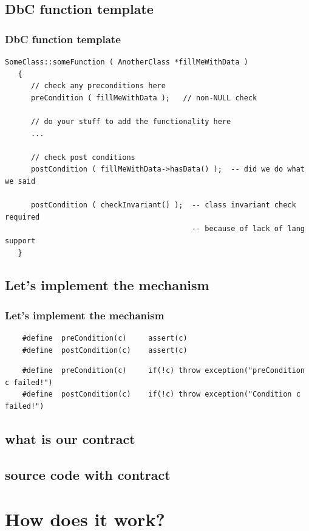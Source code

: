 \documentclass{beamer}
\begin{document}
\subsection{DbC function template}
\begin{frame}[fragile]
\frametitle{DbC function template}
\begin{lstlisting}[caption=http://www.cs.unc.edu/~stotts/COMP204/contract.html]
   SomeClass::someFunction ( AnotherClass *fillMeWithData )
   {
      // check any preconditions here
      preCondition ( fillMeWithData );   // non-NULL check

      // do your stuff to add the functionality here
      ...

      // check post conditions
      postCondition ( fillMeWithData->hasData() );  -- did we do what we said

      postCondition ( checkInvariant() );  -- class invariant check required 
                                           -- because of lack of lang support
   }
\end{lstlisting}
\end{frame}

\subsection{Let's implement the mechanism}
\begin{frame}[fragile]
\frametitle{Let's implement the mechanism}
\begin{lstlisting}
    #define  preCondition(c)     assert(c)
    #define  postCondition(c)    assert(c)
\end{lstlisting}
\begin{lstlisting}
    #define  preCondition(c)     if(!c) throw exception("preCondition c failed!")
    #define  postCondition(c)    if(!c) throw exception("Condition c failed!")
\end{lstlisting}
\end{frame}



\subsection{what is our contract}
\subsection{source code with contract}
\section{How does it work?}
\end{document}
